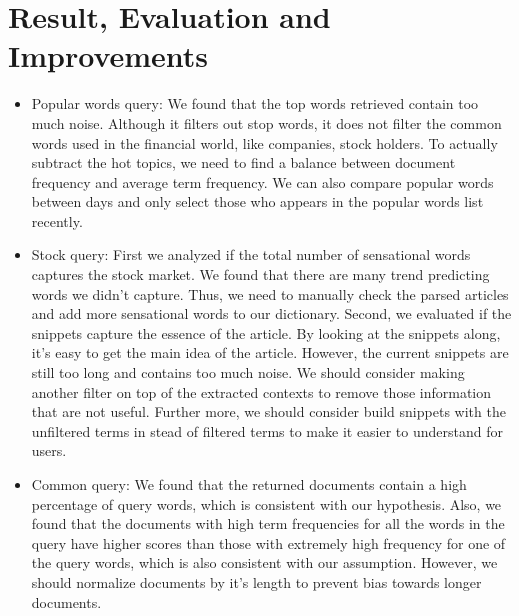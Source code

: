 \documentclass{article}
\begin{document}
\section{Result, Evaluation and Improvements}
\begin{itemize}
  \item Popular words query: We found that the top words retrieved contain too much noise. Although it filters out stop words, it does not filter the common words used in the financial world, like companies, stock holders. To actually subtract the hot topics, we need to find a balance between document frequency and average term frequency. We can also compare popular words between days and only select those who appears in the popular words list recently.
  \item Stock query: First we analyzed if the total number of sensational words captures the stock market. We found that there are many trend predicting words we didn't capture. Thus, we need to manually check the parsed articles and add more sensational words to our dictionary. Second, we evaluated if the snippets capture the essence of the article. By looking at the snippets along, it's easy to get the main idea of the article. However, the current snippets are still too long and contains too much noise. We should consider making another filter on top of the extracted contexts to remove those information that are not useful. Further more, we should consider build snippets with the unfiltered terms in stead of filtered terms to make it easier to understand for users. 
  \item Common query: We found that the returned documents contain a high percentage of query words, which is consistent with our hypothesis. Also, we found that the documents with high term frequencies for all the words in the query have higher scores than those with extremely high frequency for one of the query words, which is also consistent with our assumption. However, we should normalize documents by it's length to prevent bias towards longer documents.
\end{itemize}
\end{document}
